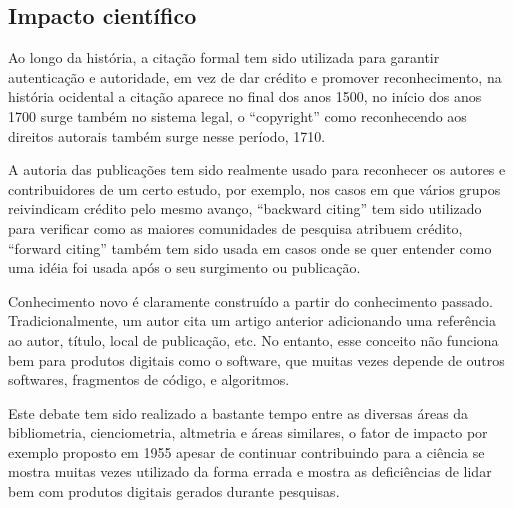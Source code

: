 \subsection{Impacto científico}


Ao longo da história, a citação formal tem sido utilizada para garantir
autenticação e autoridade, em vez de dar crédito e promover reconhecimento, na
história ocidental a citação aparece no final dos anos 1500, no início dos anos
1700 surge também no sistema legal, o ``copyright'' como reconhecendo aos
direitos autorais também surge nesse período, 1710.

A autoria das publicações tem sido realmente usado para reconhecer os autores e
contribuidores de um certo estudo, por exemplo, nos casos em que vários grupos
reivindicam crédito pelo mesmo avanço, ``backward citing'' tem sido utilizado
para verificar como as maiores comunidades de pesquisa atribuem crédito,
``forward citing'' também tem sido usada em casos onde se quer entender como
uma idéia foi usada após o seu surgimento ou publicação.

Conhecimento novo é claramente construído a partir do conhecimento passado.
Tradicionalmente, um autor cita um artigo anterior adicionando uma referência
ao autor, título, local de publicação, etc. No entanto, esse conceito não
funciona bem para produtos digitais como o software, que muitas vezes depende
de outros softwares, fragmentos de código, e algoritmos.

Este debate tem sido realizado a bastante tempo entre as diversas áreas da
bibliometria, cienciometria, altmetria e áreas similares, o fator de impacto
por exemplo proposto em 1955 apesar de continuar contribuindo para a ciência se
mostra muitas vezes utilizado da forma errada e mostra as deficiências de lidar
bem com produtos digitais gerados durante pesquisas.



